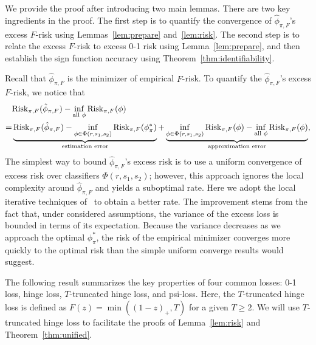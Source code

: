 \documentclass[11pt]{article}
\newcommand*{\KeepStyleUnderBrace}[1]{%
\mathop{%
\mathchoice
{\underbrace{\displaystyle#1}}%
{\underbrace{\textstyle#1}}%
{\underbrace{\scriptstyle#1}}%
{\underbrace{\scriptscriptstyle#1}}%
}\limits
}
\theoremstyle{plain}
\theoremstyle{definition}
\def\riskF{\textup{Risk}_{\pi,F}}
\begin{document}
We provide the proof after introducing two main lemmas.
There are two key ingredients in the proof. The first step is to quantify the convergence of $\hat \phi_{\pi,F}$'s excess $F$-risk using Lemmas~\ref{lem:prepare} and~\ref{lem:risk}. The second step is to relate the excess $F$-risk to excess 0-1 risk using Lemma~\ref{lem:prepare}, and then establish the sign function accuracy using Theorem~\ref{thm:identifiability}.

Recall that $\hat \phi_{\pi,F}$ is the minimizer of empirical $F$-risk.  To quantify the $\hat \phi_{\pi,F}$'s excess $F$-risk, we notice that 
\begin{align}
&\riskF(\hat \phi_{\pi,F})-\inf_{\text{all }{\phi}}\riskF(\phi)\\
=&
 \KeepStyleUnderBrace{\riskF(\hat \phi_{\pi,F})-\inf_{\phi\in\Phi(r,s_1,s_2)}\riskF(\phi_\pi^*)}_{\text{estimation error}}+\KeepStyleUnderBrace{
 \inf_{\phi\in\Phi(r,s_1,s_2)}\riskF(\phi)-\inf_{\text{all }\phi}\riskF(\phi)}_{\text{approximation error}},
 \end{align}
The simplest way to bound $\hat \phi_{\pi,F}$'s excess risk is to use a uniform convergence of excess risk over classifiers $\Phi(r,s_1,s_2)$; however, this approach ignores the local complexity around $\hat \phi_{\pi,F}$ and yields a suboptimal rate. Here we adopt the local iterative techniques of~\citet[Theorem 3]{wang2008probability} to obtain a better rate. The improvement stems from the fact that, under considered assumptions, the variance of the excess loss is bounded in terms of its expectation. Because the variance decreases as we approach the optimal $\phi^*_{\pi}$, the risk of the empirical minimizer converges more quickly to the optimal risk than the simple uniform converge results would suggest. 

The following result summarizes the key properties of four common losses: 0-1 loss, hinge loss, $T$-truncated hinge loss, and psi-loss. Here, the $T$-truncated hinge loss is defined as $F(z)=\min((1-z)_{+},T)$ for a given $T\geq 2$. We will use $T$-truncated hinge loss to facilitate the proofs of Lemma~\ref{lem:risk} and Theorem~\ref{thm:unified}. 
\end{document}
